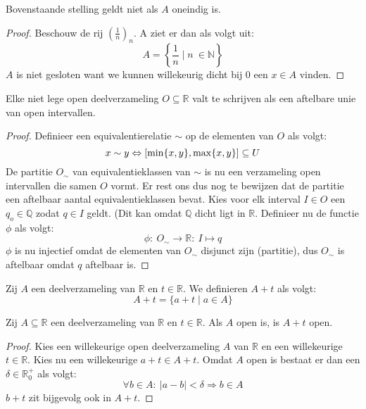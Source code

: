 \documentclass[main.tex]{subfiles}
\begin{document}
\begin{tvb}
  Bovenstaande stelling geldt niet als $A$ oneindig is.

  \begin{proof}
    Beschouw de rij $\left(\frac{1}{n}\right)_{n}$.
    A ziet er dan als volgt uit:
    \[ A = \left\{ \frac{1}{n} \mid n\ \in \mathbb{N} \right\} \]
    $A$ is niet gesloten want we kunnen willekeurig dicht bij $0$ een $x\in A$ vinden.
  \end{proof}
\end{tvb}

\begin{st}
  Elke niet lege open deelverzameling $O \subseteq \mathbb{R}$ valt te schrijven als een aftelbare unie van open intervallen.

  \begin{proof}
    Definieer een equivalentierelatie $\sim$ op de elementen van $O$ als volgt:
    \[ x \sim y \Leftrightarrow \interval{\min\{x,y\}}{\max\{x,y\}} \subseteq U \]
    De partitie $O_{\sim}$ van equivalentieklassen van $\sim$ is nu een verzameling open intervallen die samen $O$ vormt.
    Er rest ons dus nog te bewijzen dat de partitie een aftelbaar aantal equivalentieklassen bevat.
    Kies voor elk interval $I\in O$ een $q_{o}\in \mathbb{Q}$ zodat $q\in I$ geldt.
    (Dit kan omdat $\mathbb{Q}$ dicht ligt in $\mathbb{R}$.
    Definieer nu de functie $\phi$ als volgt:
    \[ \phi:\ O_{\sim} \rightarrow \mathbb{R}:\ I \mapsto q \]
    $\phi$ is nu injectief omdat de elementen van $O_{\sim}$ disjunct zijn (partitie), dus $O_{\sim}$ is aftelbaar omdat $q$ aftelbaar is.
  \end{proof}
\feed
\end{st}


\begin{de}
  Zij $A$ een deelverzameling van $\mathbb{R}$ en $t\in \mathbb{R}$.
  We definieren $A+t$ als volgt:
  \[ A + t = \{ a + t \mid a \in A \} \]
\end{de}

\begin{st}
  Zij $A \subseteq \mathbb{R}$ een deelverzameling van $\mathbb{R}$ en $t\in \mathbb{R}$.
  Als $A$ open is, is $A+t$ open.

  \begin{proof}
    Kies een willekeurige open deelverzameling $A$ van $\mathbb{R}$ en een willekeurige $t\in \mathbb{R}$.
    Kies nu een willekeurige $a+t\in A+t$.
    Omdat $A$ open is bestaat er dan een $\delta \in \mathbb{R}_{0}^{+}$ als volgt:
    \[ \forall b \in A:\ |a-b| < \delta \Rightarrow b\in A \]
    $b+t$ zit bijgevolg ook in $A+t$.
  \end{proof}
\feed
\end{st}
\end{document}
